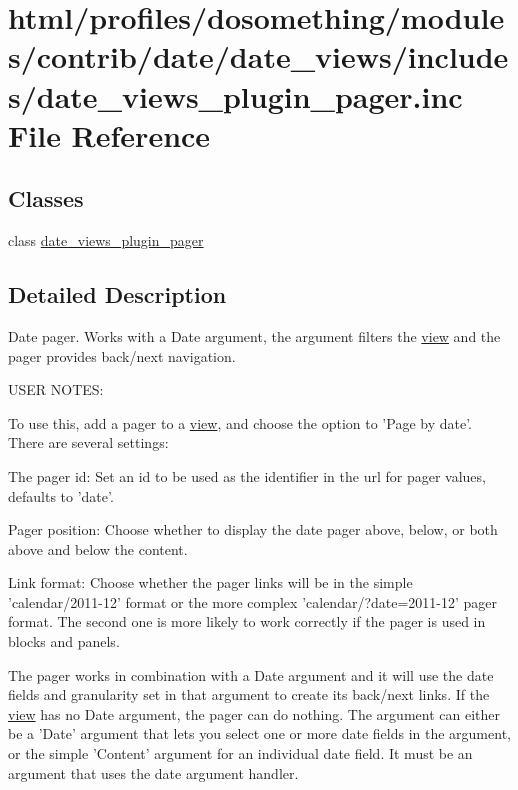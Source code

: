 \hypertarget{date__views__plugin__pager_8inc}{
\section{html/profiles/dosomething/modules/contrib/date/date\_\-views/includes/date\_\-views\_\-plugin\_\-pager.inc File Reference}
\label{date__views__plugin__pager_8inc}
}
\subsection*{Classes}
\begin{DoxyCompactItemize}
\item 
class \hyperlink{classdate__views__plugin__pager}{date\_\-views\_\-plugin\_\-pager}
\end{DoxyCompactItemize}


\subsection{Detailed Description}
Date pager. Works with a Date argument, the argument filters the \hyperlink{classview}{view} and the pager provides back/next navigation.

USER NOTES:

To use this, add a pager to a \hyperlink{classview}{view}, and choose the option to 'Page by date'. There are several settings:
\begin{DoxyItemize}
\item The pager id: Set an id to be used as the identifier in the url for pager values, defaults to 'date'.
\item Pager position: Choose whether to display the date pager above, below, or both above and below the content.
\item Link format: Choose whether the pager links will be in the simple 'calendar/2011-\/12' format or the more complex 'calendar/?date=2011-\/12' pager format. The second one is more likely to work correctly if the pager is used in blocks and panels.
\end{DoxyItemize}

The pager works in combination with a Date argument and it will use the date fields and granularity set in that argument to create its back/next links. If the \hyperlink{classview}{view} has no Date argument, the pager can do nothing. The argument can either be a 'Date' argument that lets you select one or more date fields in the argument, or the simple 'Content' argument for an individual date field. It must be an argument that uses the date argument handler.

